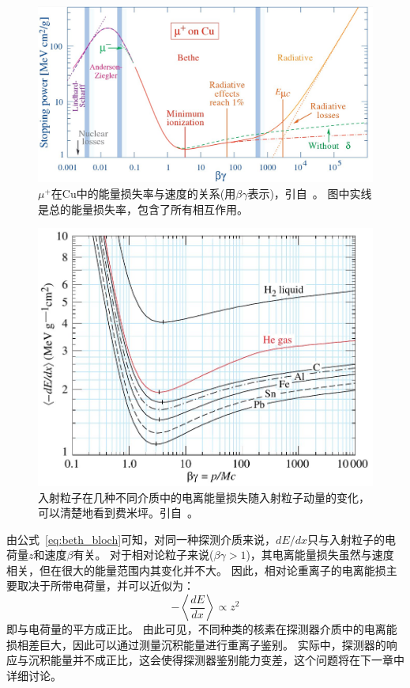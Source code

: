 \begin{figure}
	\centering
	\includegraphics[width=0.8\linewidth]{chap/description/fig/energyloss_vs_velocity}
	\caption{${\mu}^+$在Cu中的能量损失率与速度的关系(用$\beta\gamma$表示)，引自~\parencite{pdg_book}。 图中实线是总的能量损失率，包含了所有相互作用。}
	\label{fig:ch2:energyloss_vs_velocity}
\end{figure}

\begin{figure}
\centering
\includegraphics[width=0.8\linewidth]{chap/description/fig/fermi_plateau}
\caption{入射粒子在几种不同介质中的电离能量损失随入射粒子动量的变化，可以清楚地看到费米坪。引自~\parencite{pdg_book}。}
\label{fig:ch2:fermi_plateau}
\end{figure}

由公式~\ref{eq:beth_bloch}可知，对同一种探测介质来说，$dE/dx$只与入射粒子的电荷量$z$和速度$\beta$有关。
对于相对论粒子来说($\beta\gamma>1$)，其电离能量损失虽然与速度相关，但在很大的能量范围内其变化并不大。
因此，相对论重离子的电离能损主要取决于所带电荷量，并可以近似为：
\begin{equation}
-\left\langle\frac{dE}{dx}\right\rangle \propto z^2
\end{equation}
即与电荷量的平方成正比。
由此可见，不同种类的核素在探测器介质中的电离能损相差巨大，因此可以通过测量沉积能量进行重离子鉴别。
实际中，探测器的响应与沉积能量并不成正比，这会使得探测器鉴别能力变差，这个问题将在下一章中详细讨论。

